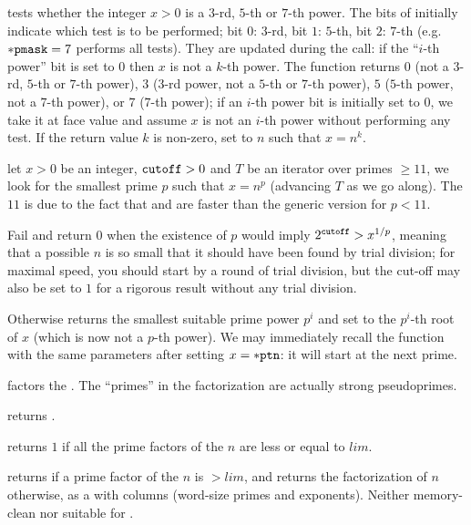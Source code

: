  tests whether the
integer $x > 0$ is a $3$-rd, $5$-th or $7$-th power. The bits of 
initially indicate which test is to be performed;
bit $0$: $3$-rd,
bit $1$: $5$-th,
bit $2$: $7$-th (e.g.~${\tt *pmask} = 7$ performs all tests). They are
updated during the call: if the ``$i$-th power'' bit is set to $0$
then $x$ is not a $k$-th power. The function returns $0$
(not a
$3$-rd,
$5$-th or
$7$-th power),
$3$
($3$-rd power,
not a $5$-th or
$7$-th power),
$5$
($5$-th power,
not a $7$-th power),
or $7$
($7$-th power); if an $i$-th power bit is initially set to $0$, we take it
at face value and assume $x$ is not an $i$-th power without performing any
test. If the return value $k$ is non-zero, set  to $n$ such that $x
= n^k$.

let $x > 0$ be an integer, ${\tt cutoff} > 0$ and $T$ be an iterator over
primes $\geq 11$, we look for the smallest prime $p$ such that $x = n^p$
(advancing $T$ as we go along). The $11$ is due to the fact that
 and  are faster than the generic version for
$p < 11$.

Fail and return $0$ when the existence of $p$ would imply $2^{{\tt cutoff}} >
x^{1/p}$, meaning that a possible $n$ is so small that it should have been
found by trial division; for maximal speed, you should start by a round of
trial division, but the cut-off may also be set to $1$ for a rigorous result
without any trial division.

Otherwise returns the smallest suitable prime power $p^i$ and set 
to the $p^i$-th root of $x$ (which is now not a $p$-th power). We may
immediately recall the function with the same parameters after setting $x =
{\tt *ptn}$: it will start at the next prime.


 factors the  . The ``primes''
in the factorization are actually strong pseudoprimes.

 returns .

 returns $1$ if all the
prime factors of the  $n$ are less or equal to $lim$.

 returns  if a prime
factor of the  $n$ is $> lim$, and returns the factorization
of $n$ otherwise, as a  with  columns (word-size
primes and exponents). Neither memory-clean nor suitable for
.

